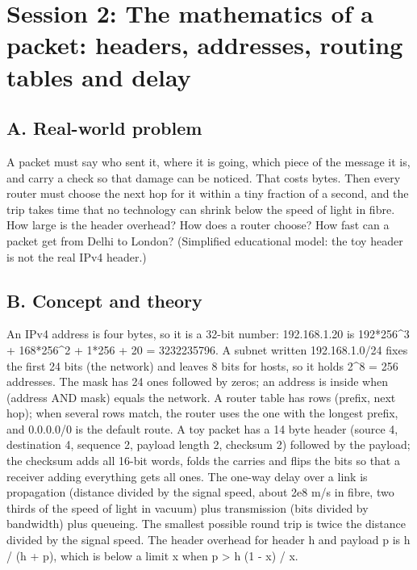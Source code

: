 \documentclass[11pt,a4paper]{article}
\begin{document}
\section{Session 2: The mathematics of a packet: headers, addresses, routing tables and delay}

\subsection*{A. Real-world problem}
A packet must say who sent it, where it is going, which piece of the message it is, and carry a check so that damage can be noticed. That costs bytes. Then every router must choose the next hop for it within a tiny fraction of a second, and the trip takes time that no technology can shrink below the speed of light in fibre. How large is the header overhead? How does a router choose? How fast can a packet get from Delhi to London? (Simplified educational model: the toy header is not the real IPv4 header.)

\subsection*{B. Concept and theory}
An IPv4 address is four bytes, so it is a 32-bit number: 192.168.1.20 is 192*256\textasciicircum{}3 + 168*256\textasciicircum{}2 + 1*256 + 20 = 3232235796. A subnet written 192.168.1.0/24 fixes the first 24 bits (the network) and leaves 8 bits for hosts, so it holds 2\textasciicircum{}8 = 256 addresses. The mask has 24 ones followed by zeros; an address is inside when (address AND mask) equals the network. A router table has rows (prefix, next hop); when several rows match, the router uses the one with the longest prefix, and 0.0.0.0/0 is the default route. A toy packet has a 14 byte header (source 4, destination 4, sequence 2, payload length 2, checksum 2) followed by the payload; the checksum adds all 16-bit words, folds the carries and flips the bits so that a receiver adding everything gets all ones. The one-way delay over a link is propagation (distance divided by the signal speed, about 2e8 m/s in fibre, two thirds of the speed of light in vacuum) plus transmission (bits divided by bandwidth) plus queueing. The smallest possible round trip is twice the distance divided by the signal speed. The header overhead for header h and payload p is h / (h + p), which is below a limit x when p \textgreater{} h (1 - x) / x.
\end{document}
